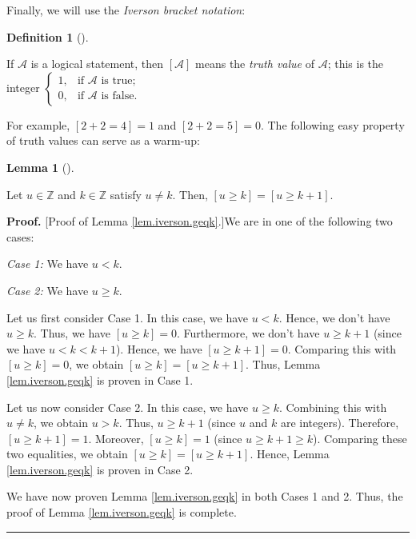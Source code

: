 \documentclass
[numbers=enddot,12pt,final,onecolumn,notitlepage,english]{scrartcl}%
\theoremstyle{definition}
\newtheorem{lem}[theo]{Lemma}
\newenvironment{lemma}[1][]
{\begin{lem}[#1]\begin{leftbar}}
{\end{leftbar}\end{lem}}
\newtheorem{defi}[theo]{Definition}
\newenvironment{definition}[1][]
{\begin{defi}[#1]\begin{leftbar}}
{\end{leftbar}\end{defi}}
\newenvironment{proof}[1][Proof]{\noindent\textbf{#1.} }{\ \rule{0.5em}{0.5em}}
\newenvironment{verlong}{}{}
\begin{document}
Finally, we will use the \emph{Iverson bracket notation}:

\begin{definition}
\label{def.iverson}If $\mathcal{A}$ is a logical statement, then $\left[
\mathcal{A}\right]  $ means the \emph{truth value} of $\mathcal{A}$; this is
the integer $%
\begin{cases}
1, & \text{if }\mathcal{A}\text{ is true};\\
0, & \text{if }\mathcal{A}\text{ is false}.
\end{cases}
$
\end{definition}

For example, $\left[  2+2=4\right]  =1$ and $\left[  2+2=5\right]  =0$. The
following easy property of truth values can serve as a warm-up:

\begin{lemma}
\label{lem.iverson.geqk}Let $u\in\mathbb{Z}$ and $k\in\mathbb{Z}$ satisfy
$u\neq k$. Then, $\left[  u\geq k\right]  =\left[  u\geq k+1\right]  $.
\end{lemma}

\begin{verlong}
\begin{proof}
[Proof of Lemma \ref{lem.iverson.geqk}.]We are in one of the following two cases:

\textit{Case 1:} We have $u<k$.

\textit{Case 2:} We have $u\geq k$.\medskip

Let us first consider Case 1. In this case, we have $u<k$. Hence, we don't
have $u\geq k$. Thus, we have $\left[  u\geq k\right]  =0$. Furthermore, we
don't have $u\geq k+1$ (since we have $u<k<k+1$). Hence, we have $\left[
u\geq k+1\right]  =0$. Comparing this with $\left[  u\geq k\right]  =0$, we
obtain $\left[  u\geq k\right]  =\left[  u\geq k+1\right]  $. Thus, Lemma
\ref{lem.iverson.geqk} is proven in Case 1. \medskip

Let us now consider Case 2. In this case, we have $u\geq k$. Combining this
with $u\neq k$, we obtain $u>k$. Thus, $u\geq k+1$ (since $u$ and $k$ are
integers). Therefore, $\left[  u\geq k+1\right]  =1$. Moreover, $\left[  u\geq
k\right]  =1$ (since $u\geq k+1\geq k$). Comparing these two equalities, we
obtain $\left[  u\geq k\right]  =\left[  u\geq k+1\right]  $. Hence, Lemma
\ref{lem.iverson.geqk} is proven in Case 2. \medskip

We have now proven Lemma \ref{lem.iverson.geqk} in both Cases 1 and 2. Thus,
the proof of Lemma \ref{lem.iverson.geqk} is complete.
\end{proof}
\end{verlong}
\end{document}
